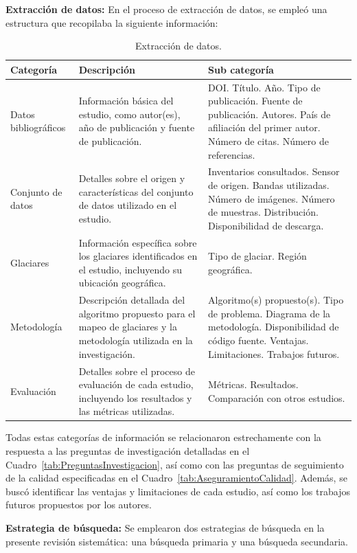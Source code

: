 \textbf{Extracción de datos:} En el proceso de extracción de datos, se empleó una estructura que recopilaba la siguiente información:

\begin{table}[H]
\small
\caption{Extracción de datos.}
\begin{tabularx}{\textwidth}{lXp{4.8cm}}
\hline
\textbf{Categoría} & \textbf{Descripción} & \textbf{Sub categoría}\\
\hline
Datos bibliográficos & Información básica del estudio, como autor(es), año de publicación y fuente de publicación. & DOI. Título. Año. Tipo de publicación. Fuente de publicación. Autores. País de afiliación del primer autor. Número de citas. Número de referencias. \\ \hline
Conjunto de datos & Detalles sobre el origen y características del conjunto de datos utilizado en el estudio. & Inventarios consultados. Sensor de origen. Bandas utilizadas. Número de imágenes. Número de muestras. Distribución. Disponibilidad de descarga. \\ \hline
Glaciares & Información específica sobre los glaciares identificados en el estudio, incluyendo su ubicación geográfica. & Tipo de glaciar. Región geográfica. \\ \hline
Metodología & Descripción detallada del algoritmo propuesto para el mapeo de glaciares y la metodología utilizada en la investigación. & Algoritmo(s) propuesto(s). Tipo de problema. Diagrama de la metodología. Disponibilidad de código fuente. Ventajas. Limitaciones. Trabajos futuros.\\ \hline
Evaluación & Detalles sobre el proceso de evaluación de cada estudio, incluyendo los resultados y las métricas utilizadas. & Métricas. Resultados. Comparación con otros estudios. \\ \hline
\end{tabularx}
\label{tab:ExtracionDatos}
\end{table}

Todas estas categorías de información se relacionaron estrechamente con la respuesta a las preguntas de investigación detalladas en el Cuadro~\ref{tab:PreguntasInvestigacion}, así como con las preguntas de seguimiento de la calidad especificadas en el Cuadro~\ref{tab:AseguramientoCalidad}. Además, se buscó identificar las ventajas y limitaciones de cada estudio, así como los trabajos futuros propuestos por los autores.

\textbf{Estrategia de búsqueda:} Se emplearon dos estrategias de búsqueda en la presente revisión sistemática: una búsqueda primaria y una búsqueda secundaria.

